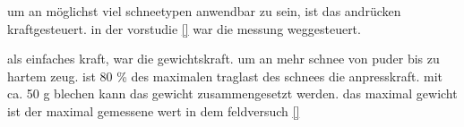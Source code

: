 um an möglichst viel schneetypen anwendbar zu sein, ist das andrücken kraftgesteuert. in der vorstudie \ref{} war die messung weggesteuert.

als einfaches kraft, war die gewichtskraft. um an mehr schnee von puder bis zu hartem zeug. ist 80 \% des maximalen traglast des schnees die anpresskraft. mit ca. 50 g blechen kann das gewicht zusammengesetzt werden. das maximal gewicht ist der maximal gemessene wert in dem feldversuch \ref{}
